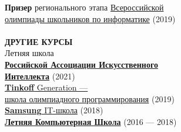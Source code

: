 \documentclass{article}
\begin{document}
\begin{vwcol}[widths={0.8,0.2},
 sep=.8cm, justify=flush,rule=0pt,indent=1em]
\textbf{Призер} регионального этапа \href{https://vos.olimpiada.ru/}{Всероссийской\\олимпиады школьников по информатике} (2019)\\
\\
\noindent\textcolor[rgb]{0.1255,0.2902,0.7843}{\textbf{ДРУГИЕ КУРСЫ}}\\
Летняя школа\\\href{https://raai.space/}{\textbf{Российской Ассоциации Искусственного\\Интеллекта}} (2021)\\
\href{https://fintech.tinkoff.ru/school/generation/}{\textbf{Tinkoff} Generation —\\
школа олимпиадного программирования} (2019)\\
\href{https://myitschool.ru/}{\textbf{Samsung} IT-школа} (2018)\\
\href{https://lksh.ru/}{\textbf{Летняя Компьютерная Школа}} (2016 — 2018)\\
\end{vwcol} 
\end{document}
